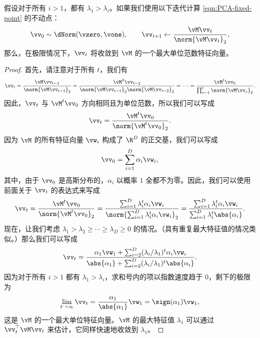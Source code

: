 \documentclass[../../book-main_zh.tex]{subfiles}
\begin{document}
\begin{theorem}[幂迭代]
    假设对于所有 \(i > 1\)，都有 \(\lambda_{1} > \lambda_{i}\)。如果我们使用以下迭代计算
    \eqref{eqn:PCA-fixed-point} 的不动点：
    \begin{equation}\label{eq:power_iteration}
        \vv_{0} \sim \dNorm(\vzero, \vone), \qquad \vv_{t + 1} \gets
        \frac{\vM\vv_{t}}{\norm{\vM\vv_{t}}_{2}},
    \end{equation}
    那么，在极限情况下，\(\vv_{t}\) 将收敛到 \(\vM\) 的一个最大单位范数特征向量。
\end{theorem}

\begin{proof} 首先，请注意对于所有 \(t\)，我们有
    \begin{equation}
        \vv_{t} = \frac{\vM\vv_{t - 1}}{\norm{\vM\vv_{t - 1}}_{2}} =
        \frac{\vM^{2}\vv_{t - 2}}{\norm{\vM\vv_{t -
        1}}_{2}\norm{\vM\vv_{t - 2}}_{2}} = \cdots =
        \frac{\vM^{t}\vv_{0}}{\prod_{s = 1}^{t}\norm{\vM\vv_{s}}_{2}}.
    \end{equation}
    因此，\(\vv_{t}\) 与 \(\vM^{t}\vv_{0}\) 方向相同且为单位范数，所以我们可以写成
    \begin{equation}
        \vv_{t} = \frac{\vM^{t}\vv_{0}}{\norm{\vM^{t}\vv_{0}}_{2}}.
    \end{equation}
    因为 $\vM$ 的所有特征向量 \(\vw_{i}\) 构成了 \(\R^{D}\) 的正交基，我们可以写成
    \begin{equation}
        \vv_{0} = \sum_{i = 1}^{D}\alpha_{i}\vw_{i},
    \end{equation}
    其中，由于 \(\vv_{0}\) 是高斯分布的，\(\alpha_{i}\) 以概率 \(1\)
    全都不为零。因此，我们可以使用前面关于 \(\vv_{t}\) 的表达式来写成
    \begin{equation}
        \vv_{t} = \frac{\vM^{t}\vv_{0}}{\norm{\vM^{t}\vv_{0}}_{2}} =
        \frac{\sum_{i =
        1}^{D}\lambda_{i}^{t}\alpha_{i}\vw_{i}}{\norm{\sum_{i =
        1}^{D}\lambda_{i}^{t}\alpha_{i}\vw_{i}}_{2}} = \frac{\sum_{i
        = 1}^{D}\lambda_{i}^{t}\alpha_{i}\vw_{i}}{\sum_{i =
        1}^{D}\lambda_{i}^{t}\abs{\alpha_{i}}}.
    \end{equation}
    现在，让我们考虑 \(\lambda_{1} > \lambda_{2}
    \geq \cdots \geq \lambda_{D} \geq 0\) 的情况。（具有重复最大特征值的情况类似。）那么我们可以写成
    \begin{equation}
        \vv_{t} = \frac{\alpha_{1}\vw_{1} + \sum_{i =
        2}^{D}(\lambda_{i}/\lambda_{1})^{t}\alpha_{i}\vw_{i}}{\abs{\alpha_{1}}
        + \sum_{i = 2}^{D}(\lambda_{i}/\lambda_{1})^{t}\abs{\alpha_{i}}}.
    \end{equation}
    因为对于所有 \(i > 1\) 都有 \(\lambda_{1} > \lambda_{i}\)，求和号内的项以指数速度趋于 \(0\)，剩下的极限为
    \begin{equation}
        \lim_{t \to \infty}\vv_{t} =
        \frac{\alpha_{1}}{\abs{\alpha_{1}}}\vw_{1} = \sign(\alpha_{1})\vw_{1},
    \end{equation}
    这是 \(\vM\) 的一个最大单位特征向量。\(\vM\) 的最大特征值 \(\lambda_{1}\) 可以通过
    \(\vv_{t}^{\top}\vM\vv_{t}\) 来估计，它同样快速地收敛到 \(\lambda_{1}\)。
\end{proof}
\end{document}
